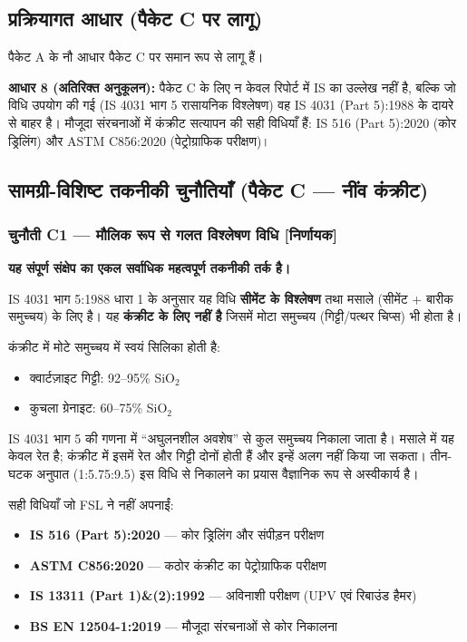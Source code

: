 \documentclass[12pt, a4paper]{article}
\begin{document}
\subsection{प्रक्रियागत आधार (पैकेट C पर लागू)}

पैकेट A के नौ आधार पैकेट C पर समान रूप से लागू हैं।

\textbf{आधार 8 (अतिरिक्त अनुकूलन):} पैकेट C के लिए न केवल रिपोर्ट में IS का उल्लेख नहीं है, बल्कि जो विधि उपयोग की गई (IS 4031 भाग 5 रासायनिक विश्लेषण) वह IS 4031 (Part 5):1988 के दायरे से बाहर है। मौजूदा संरचनाओं में कंक्रीट सत्यापन की सही विधियाँ हैं: IS 516 (Part 5):2020 (कोर ड्रिलिंग) और ASTM C856:2020 (पेट्रोग्राफिक परीक्षण)।

\subsection{सामग्री-विशिष्ट तकनीकी चुनौतियाँ (पैकेट C --- नींव कंक्रीट)}

\subsubsection{चुनौती C1 --- मौलिक रूप से गलत विश्लेषण विधि \textbf{[निर्णायक]}}

\begin{criticalbox}
\textbf{यह संपूर्ण संक्षेप का एकल सर्वाधिक महत्वपूर्ण तकनीकी तर्क है।}

IS 4031 भाग 5:1988 धारा 1 के अनुसार यह विधि \textbf{सीमेंट के विश्लेषण} तथा मसाले (सीमेंट + बारीक समुच्चय) के लिए है। यह \textbf{कंक्रीट के लिए नहीं है} जिसमें मोटा समुच्चय (गिट्टी/पत्थर चिप्स) भी होता है।

कंक्रीट में मोटे समुच्चय में स्वयं सिलिका होती है:
\begin{itemize}
  \item क्वार्टज़ाइट गिट्टी: 92--95\% SiO$_2$
  \item कुचला ग्रेनाइट: 60--75\% SiO$_2$
\end{itemize}

IS 4031 भाग 5 की गणना में ``अघुलनशील अवशेष'' से कुल समुच्चय निकाला जाता है। मसाले में यह केवल रेत है; कंक्रीट में इसमें रेत और गिट्टी दोनों होती हैं और इन्हें अलग नहीं किया जा सकता। तीन-घटक अनुपात (1:5.75:9.5) इस विधि से निकालने का प्रयास वैज्ञानिक रूप से अस्वीकार्य है।

सही विधियाँ जो FSL ने नहीं अपनाईं:
\begin{itemize}
  \item \textbf{IS 516 (Part 5):2020} --- कोर ड्रिलिंग और संपीड़न परीक्षण
  \item \textbf{ASTM C856:2020} --- कठोर कंक्रीट का पेट्रोग्राफिक परीक्षण
  \item \textbf{IS 13311 (Part 1)\&(2):1992} --- अविनाशी परीक्षण (UPV एवं रिबाउंड हैमर)
  \item \textbf{BS EN 12504-1:2019} --- मौजूदा संरचनाओं से कोर निकालना
\end{itemize}
\end{criticalbox}
\end{document}
